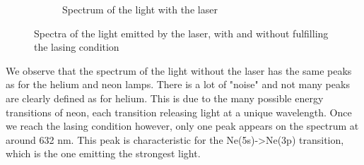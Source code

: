 \documentclass{scrartcl}
\begin{document}
\begin{figure}[!ht]
\begin{subfigure}{0.49\textwidth}
      \caption{Spectrum of the light with the laser}
      \label{fig:yesLaser}
    \end{subfigure}
    \caption{Spectra of the light emitted by the laser, with and without fulfilling the lasing condition}
    \label{fig:laserSpectra}
\end{figure}
\FloatBarrier

We observe that the spectrum of the light without the laser has the same peaks as for the helium and neon lamps. There is a lot of "noise" and not many peaks are clearly defined as for helium. This is due to the many possible energy transitions of neon, each transition releasing light at a unique wavelength. Once we reach the lasing condition however, only one peak appears on the spectrum at around 632 nm. This peak is characteristic for the Ne(5s)->Ne(3p) transition, which is the one emitting the strongest light.
\end{document}
